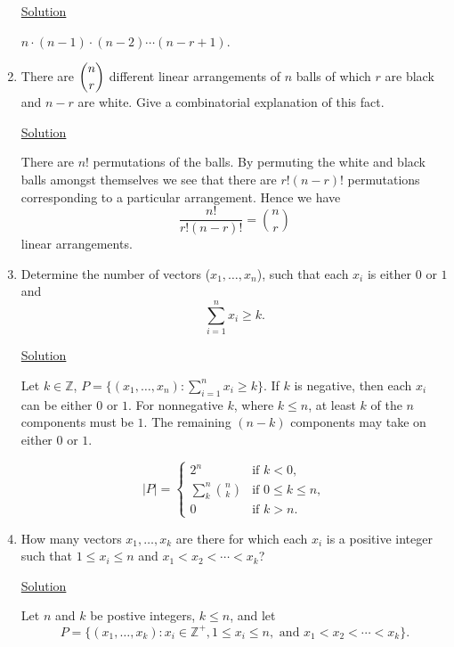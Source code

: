 \begin{enumerate}
\underline{Solution}

$n \cdot (n - 1) \cdot (n - 2) \cdots (n - r + 1)$.

\item There are $\dbinom{n}{r}$ different linear arrangements of $n$ balls of
which $r$ are black and $n - r$ are white. Give a combinatorial explanation of
this fact.

\underline{Solution}

There are $n!$ permutations of the balls. By permuting the white and black balls
amongst themselves we see that there are $r!(n - r)!$ permutations corresponding
to a particular arrangement. Hence we have 
\[\frac{n!}{r!(n - r)!} = \binom{n}{r}\] linear arrangements.

\item Determine the number of vectors ($x_1,\ldots, x_n$), such that each $x_i$
is either $0$ or $1$ and
\[\sum_{i=1}^nx_i \ge k.\]

\underline{Solution}

Let $k \in \mathbb{Z}$, $P = \{(x_1, \dots, x_n): \sum_{i=1}^nx_i \ge k\}$.
If $k$ is negative, then each $x_i$ can be either $0$ or $1$. For nonnegative
$k$, where $k \le n$, at least $k$ of the $n$ components must be $1$.
The remaining $(n - k)$ components may take on either $0$ or $1$.

\begin{equation*}
|P| = \left\{
\begin{array}{rl}
2^{n} & \text{if } k < 0,\\
\displaystyle{\sum_k^n\binom{n}{k}} & \text{if } 0 \le k \le n,\\
0 & \text{if } k > n.
\end{array} \right.
\end{equation*}

\item How many vectors $x_1, \ldots, x_k$ are there for which each $x_i$ is a
positive integer such that $1 \le x_i \le n$ and $x_1 < x_2 < \cdots < x_k$?

\underline{Solution}

Let $n$ and $k$ be postive integers, $k \le n$, and let
\[P = \{(x_1, \dots, x_k): x_i \in \mathbb{Z}^+, 1 \le x_i \le n,
\mbox{ and } x_1 < x_2 < \cdots < x_k\}.\]



\end{enumerate}
